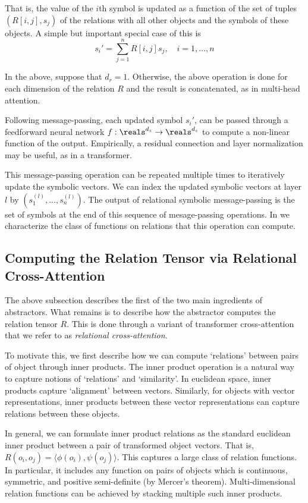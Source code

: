 That is, the value of the $i$th symbol is updated as a function of the set of tuples $(R[i,j], s_j)$ of the relations with all other objects and the symbols of these objects. A simple but important special case of this is
\begin{equation}
    \label{eq:linear_symbolic_mp}
    s_i' = \sum_{j=1}^{n} R[i,j] s_j, \quad i=1, ..., n
\end{equation}

In the above, suppose that $d_r = 1$. Otherwise, the above operation is done for each dimension of the relation $R$ and the result is concatenated, as in multi-head attention.

Following message-passing, each updated symbol $s_i'$, can be passed through a feedforward neural network $f:\reals^{d_s}\rightarrow \reals^{d_s}$ to compute a non-linear function of the output. Empirically, a residual connection and layer normalization may be useful, as in a transformer.

This message-passing operation can be repeated multiple times to iteratively update the symbolic vectors. We can index the updated symbolic vectors at layer $l$ by $(s_1^{(l)}, ..., s_n^{(l)})$. The output of relational symbolic message-passing is the set of symbols at the end of this sequence of mesage-passing operations. In  we characterize the class of functions on relations that this operation can compute.

\subsection{Computing the Relation Tensor via Relational Cross-Attention}

The above subsection describes the first of the two main ingredients of abstractors. What remains is to describe how the abstractor computes the relation tensor $R$. This is done through a variant of transformer cross-attention that we refer to as \textit{relational cross-attention}.

To motivate this, we first describe how we can compute `relations' between pairs of object through inner products. The inner product operation is a natural way to capture notions of `relations' and `similarity'. In euclidean space, inner products capture `alignment' between vectors. Similarly, for objects with vector representations, inner products between these vector representations can capture relations between these objects.

In general, we can formulate inner product relations as the standard euclidean inner product between a pair of transformed object vectors. That is, $R(o_i, o_j) = \langle \phi(o_i), \psi(o_j) \rangle$. This captures a large class of relation functions. In particular, it includes any function on pairs of objects which is continuous, symmetric, and positive semi-definite (by Mercer's theorem). Multi-dimensional relation functions can be achieved by stacking multiple such inner products.


